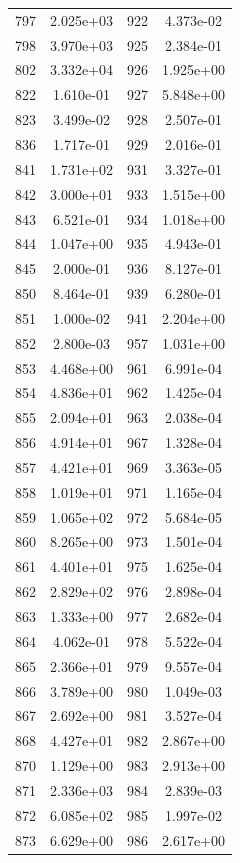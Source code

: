 \documentclass[12pt]{article}
\begin{document}
\begin{longtable}{@{}cccc@{}}
797 & 2.025e+03 & 922 & 4.373e-02 \\
798 & 3.970e+03 & 925 & 2.384e-01 \\
802 & 3.332e+04 & 926 & 1.925e+00 \\
822 & 1.610e-01 & 927 & 5.848e+00 \\
823 & 3.499e-02 & 928 & 2.507e-01 \\
836 & 1.717e-01 & 929 & 2.016e-01 \\
841 & 1.731e+02 & 931 & 3.327e-01 \\
842 & 3.000e+01 & 933 & 1.515e+00 \\
843 & 6.521e-01 & 934 & 1.018e+00 \\
844 & 1.047e+00 & 935 & 4.943e-01 \\
845 & 2.000e-01 & 936 & 8.127e-01 \\
850 & 8.464e-01 & 939 & 6.280e-01 \\
851 & 1.000e-02 & 941 & 2.204e+00 \\
852 & 2.800e-03 & 957 & 1.031e+00 \\
853 & 4.468e+00 & 961 & 6.991e-04 \\
854 & 4.836e+01 & 962 & 1.425e-04 \\
855 & 2.094e+01 & 963 & 2.038e-04 \\
856 & 4.914e+01 & 967 & 1.328e-04 \\
857 & 4.421e+01 & 969 & 3.363e-05 \\
858 & 1.019e+01 & 971 & 1.165e-04 \\
859 & 1.065e+02 & 972 & 5.684e-05 \\
860 & 8.265e+00 & 973 & 1.501e-04 \\
861 & 4.401e+01 & 975 & 1.625e-04 \\
862 & 2.829e+02 & 976 & 2.898e-04 \\
863 & 1.333e+00 & 977 & 2.682e-04 \\
864 & 4.062e-01 & 978 & 5.522e-04 \\
865 & 2.366e+01 & 979 & 9.557e-04 \\
866 & 3.789e+00 & 980 & 1.049e-03 \\
867 & 2.692e+00 & 981 & 3.527e-04 \\
868 & 4.427e+01 & 982 & 2.867e+00 \\
870 & 1.129e+00 & 983 & 2.913e+00 \\
871 & 2.336e+03 & 984 & 2.839e-03 \\
872 & 6.085e+02 & 985 & 1.997e-02 \\
873 & 6.629e+00 & 986 & 2.617e+00 \\

\end{longtable}
\end{document}
